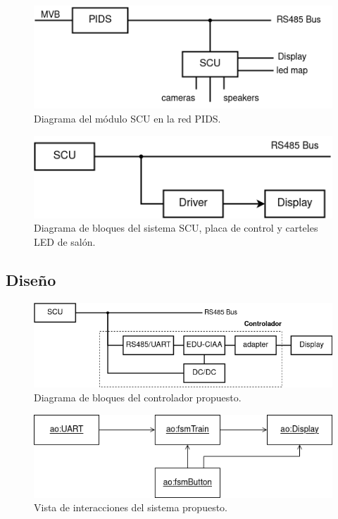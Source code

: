 \begin{figure}[ht]
	\centering
	\includegraphics[width=1\textwidth]{./Figures/diagPidsScuDevices.png}
	\caption{Diagrama del módulo SCU en la red PIDS.}
	\label{fig:diagPidsScuDevices}
\end{figure}

\begin{figure}[ht]
	\centering
	\includegraphics[width=1\textwidth]{./Figures/diagScuDriverDisplay.png}
	\caption{Diagrama de bloques del sistema SCU, placa de control y carteles LED de salón.}
	\label{fig:diagScuDriverDisplay}
\end{figure}

\pagebreak
\subsection{Diseño}


\begin{figure}[ht]
	\centering
	\includegraphics[width=1\textwidth]{./Figures/diagVistaReDisenhoEduCIAA.png}
	\caption{Diagrama de bloques del controlador propuesto.}
	\label{fig:diagVistaReDisenhoEduCIAA}
\end{figure}


\begin{figure}[ht]
	\centering
	\includegraphics[width=1\textwidth]{./Figures/diagVistaDisenho.png}
	\caption{Vista de interacciones del sistema propuesto.}
	\label{fig:diagVistaDisenho}
\end{figure}

